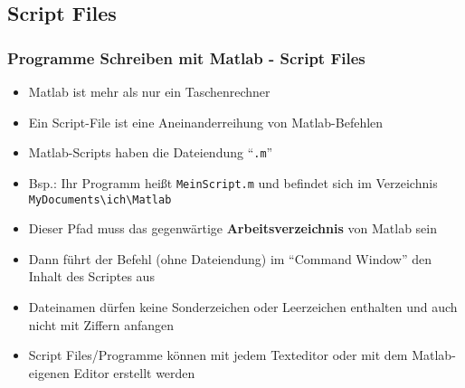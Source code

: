     \subsection{Script Files}
    \begin{frame}
        \frametitle{Programme Schreiben mit Matlab - Script Files}
        \begin{itemize}
            \item Matlab ist mehr als nur ein Taschenrechner
            \item Ein Script-File ist eine Aneinanderreihung von Matlab-Befehlen
            \item Matlab-Scripts haben die Dateiendung ``\texttt{.m}''
            \item Bsp.: Ihr Programm heißt \texttt{MeinScript.m} und befindet sich im Verzeichnis \texttt{MyDocuments\textbackslash ich\textbackslash Matlab}
            \item Dieser Pfad muss das gegenwärtige \textbf{Arbeitsverzeichnis} von Matlab sein
            \item Dann führt der Befehl  (ohne Dateiendung) im ``Command Window'' den Inhalt des Scriptes aus
            \item Dateinamen dürfen keine Sonderzeichen oder Leerzeichen enthalten und auch nicht mit Ziffern anfangen
            \item Script Files/Programme können mit jedem Texteditor oder mit dem Matlab-eigenen Editor erstellt werden
          \end{itemize}
      \end{frame}


